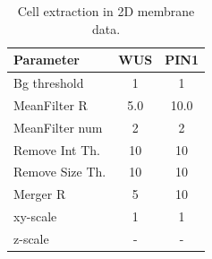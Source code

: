 \documentclass[a4paper,12pt]{article}
\begin{document}
\begin{table}
	\begin{center}
		\begin{tabular}{|l|cc|}
			\hline
			Parameter & WUS & PIN1\\
			\hline
			Bg threshold & 1 & 1\\
			MeanFilter R & 5.0 & 10.0\\
			MeanFilter num & 2 & 2\\
			Remove Int Th. & 10 & 10\\
			Remove Size Th. & 10 & 10\\
			Merger R & 5 & 10\\
			xy-scale & 1 & 1\\
			z-scale & - & -\\
			\hline
		\end{tabular}
		\caption{Cell extraction in 2D membrane data.}
		\label{tab:membrane}
	\end{center}
\end{table}



\end{document}
